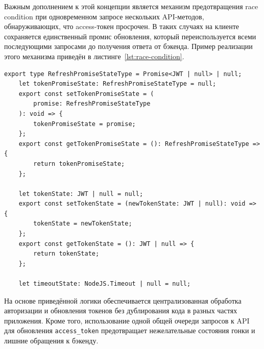 Важным дополнением к этой концепции является механизм предотвращения race condition при одновременном запросе нескольких API-методов, обнаруживающих, что access-токен просрочен. В таких случаях на клиенте сохраняется единственный промис обновления, который переиспользуется всеми последующими запросами до получения ответа от бэкенда. Пример реализации этого механизма приведён в листинге~\ref{lst:race-condition}.

\begin{lstlisting}[caption={Механизм предотвращения race condition при рефреше токена}, label={lst:race-condition}]
	export type RefreshPromiseStateType = Promise<JWT | null> | null;
	let tokenPromiseState: RefreshPromiseStateType = null;
	export const setTokenPromiseState = (
		promise: RefreshPromiseStateType
	): void => {
		tokenPromiseState = promise;
	};
	export const getTokenPromiseState = (): RefreshPromiseStateType => {
		return tokenPromiseState;
	};

	let tokenState: JWT | null = null;
	export const setTokenState = (newTokenState: JWT | null): void => {
		tokenState = newTokenState;
	};
	export const getTokenState = (): JWT | null => {
		return tokenState;
	};

	let timeoutState: NodeJS.Timeout | null = null;
\end{lstlisting}

На основе приведённой логики обеспечивается централизованная обработка авторизации и обновления токенов без дублирования кода в разных частях приложения. Кроме того, использование одной общей очереди запросов к API для обновления \texttt{access\_token} предотвращает нежелательные состояния гонки и лишние обращения к бэкенду.
